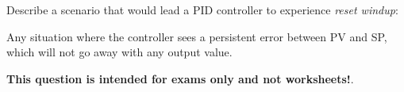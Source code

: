 

Describe a scenario that would lead a PID controller to experience {\it reset windup}:

\vskip 100pt







Any situation where the controller sees a persistent error between PV and SP, which will not go away with any output value.
 






{\bf This question is intended for exams only and not worksheets!}.



